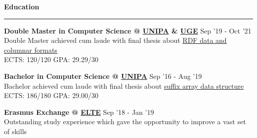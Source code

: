 \documentclass[11pt,letterpaper]{article}
\begin{document}
\begin{justify}
      {\large \textbf{Education} \strut}
      \hrule
      \begin{itemize}[label={}, leftmargin=0pt]
            \begin{item}
                  \textbf{Double Master in Computer Science @ \href{https://www.unipa.it/mobilita/en/}{UNIPA} \& \href{https://www.univ-gustave-eiffel.fr/en/}{UGE}}
                  \hfill
                  Sep '19 - Oct '21
                  \vspace{0.05cm}
                  \\
                  Double Master achieved cum laude with final thesis about \href{https://raw.githubusercontent.com/dariocurr/thesis/main/thesis.pdf}{RDF data and columnar formats}
                  \\
                  ECTS: 120/120 \hspace{0.33cm} GPA: 29.29/30
            \end{item}
            \begin{item}
                  \textbf{Bachelor in Computer Science @ \href{https://www.unipa.it/mobilita/en/}{UNIPA}}
                  \hfill
                  Sep '16 - Aug '19
                  \vspace{0.05cm}
                  \\
                  Bachelor achieved cum laude with final thesis about \href{https://dariocurr.github.io/assets/img/poster.png}{suffix array data structure}
                  \\
                  ECTS: 186/180 \hspace{0.33cm} GPA: 29.00/30
            \end{item}
            \begin{item}
                  \textbf{Erasmus Exchange @ \href{https://www.elte.hu/en/}{ELTE}}
                  \hfill
                  Sep '18 - Jan '19
                  \vspace{0.05cm}
                  \\
                  Outstanding study experience which gave the opportunity to improve a vast set of skills
            \end{item}
      \end{itemize}


\end{justify}
\end{document}
